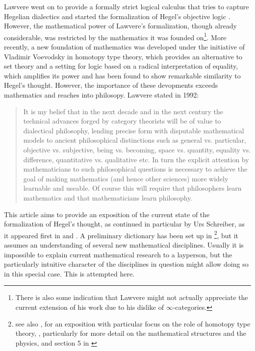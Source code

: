 \documentclass{article}
\begin{document}
Lawvere went on to provide a formally strict logical calculus that tries to capture Hegelian dialectics and started the formalization of Hegel's objective logic \cite{Law91}. However, the mathematical power of Lawvere's formalization, though already considerable, was restricted by the mathematics it was founded on\footnote{There is also some indication that Lawvere might not actually appreciate the current extension of his work due to his dislike of $\infty$-categories.}. More recently, a new foundation of mathematics was developed under the initiative of Vladimir Voevodsky in homotopy type theory, which provides an alternative to set theory and a setting for logic based on a radical interpretation of equality, which amplifies its power and has been found to show remarkable similarity to Hegel's thought. However, the importance of these devopments exceeds mathematics and reaches into philosopy. Lawvere stated in 1992\cite{Lawvere92}:

\begin{quote}
It is my belief that in the next decade and in the next century the technical advances forged by category theorists will be of value to dialectical philosophy, lending precise form with disputable mathematical models to ancient philosophical distinctions such as general vs. particular, objective vs. subjective, being vs. becoming, space vs. quantity, equality vs. difference, quantitative vs. qualitative etc. In turn the explicit attention by mathematicians to such philosophical questions is necessary to achieve the goal of making mathematics (and hence other sciences) more widely learnable and useable. Of course this will require that philosophers learn mathematics and that mathematicians learn philosophy.    
\end{quote}

This article aims to provide an exposition of the current state of the formalization of Hegel's thought, as continued in particular by Urs Schreiber, as it appeared first in \cite{SQuant} and \cite{SSOrb}. A preliminary dictionary has been set up in \cite{nlabsol} \footnote{see also \cite{Stalk}, \cite{SSh} for an exposition with particular focus on the role of homotopy type theory, \cite{dcct}, particularly for more detail on the mathematical structures and the physics, and section 5 in \cite{Cor}}, but it assumes an understanding of several new mathematical disciplines. Usually it is impossible to explain current mathematical research to a layperson, but the particularly intuitive character of the disciplines in question might allow doing so in this special case. This is attempted here.
\end{document}
